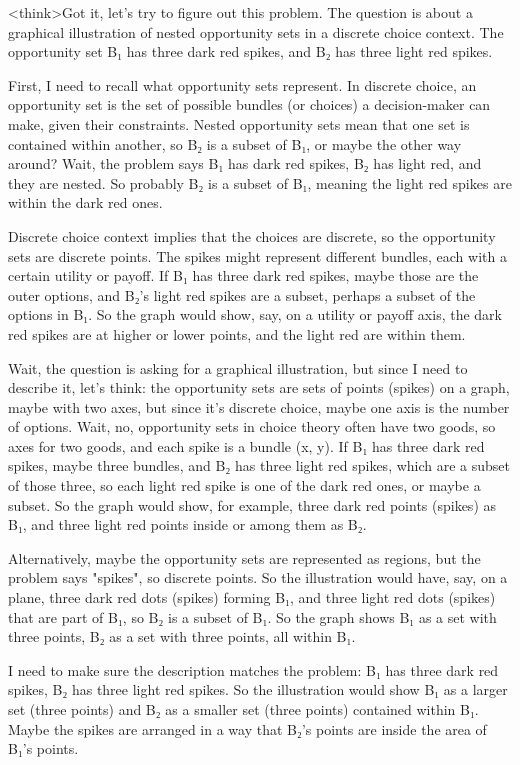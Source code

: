 <think>Got it, let's try to figure out this problem. The question is about a graphical illustration of nested opportunity sets in a discrete choice context. The opportunity set B₁ has three dark red spikes, and B₂ has three light red spikes. 

First, I need to recall what opportunity sets represent. In discrete choice, an opportunity set is the set of possible bundles (or choices) a decision-maker can make, given their constraints. Nested opportunity sets mean that one set is contained within another, so B₂ is a subset of B₁, or maybe the other way around? Wait, the problem says B₁ has dark red spikes, B₂ has light red, and they are nested. So probably B₂ is a subset of B₁, meaning the light red spikes are within the dark red ones. 

Discrete choice context implies that the choices are discrete, so the opportunity sets are discrete points. The spikes might represent different bundles, each with a certain utility or payoff. If B₁ has three dark red spikes, maybe those are the outer options, and B₂'s light red spikes are a subset, perhaps a subset of the options in B₁. So the graph would show, say, on a utility or payoff axis, the dark red spikes are at higher or lower points, and the light red are within them. 

Wait, the question is asking for a graphical illustration, but since I need to describe it, let's think: the opportunity sets are sets of points (spikes) on a graph, maybe with two axes, but since it's discrete choice, maybe one axis is the number of options. Wait, no, opportunity sets in choice theory often have two goods, so axes for two goods, and each spike is a bundle (x, y). If B₁ has three dark red spikes, maybe three bundles, and B₂ has three light red spikes, which are a subset of those three, so each light red spike is one of the dark red ones, or maybe a subset. So the graph would show, for example, three dark red points (spikes) as B₁, and three light red points inside or among them as B₂. 

Alternatively, maybe the opportunity sets are represented as regions, but the problem says "spikes", so discrete points. So the illustration would have, say, on a plane, three dark red dots (spikes) forming B₁, and three light red dots (spikes) that are part of B₁, so B₂ is a subset of B₁. So the graph shows B₁ as a set with three points, B₂ as a set with three points, all within B₁. 

I need to make sure the description matches the problem: B₁ has three dark red spikes, B₂ has three light red spikes. So the illustration would show B₁ as a larger set (three points) and B₂ as a smaller set (three points) contained within B₁. Maybe the spikes are arranged in a way that B₂'s points are inside the area of B₁'s points. 

